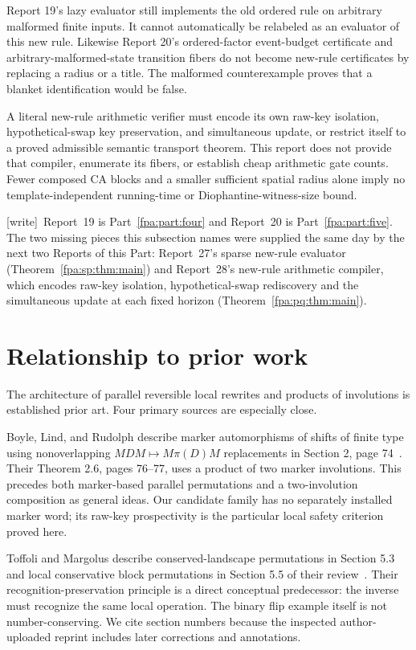 \documentclass[11pt,a4paper]{article}
\numberwithin{equation}{section}
\newcommand{\wtag}{\textup{[write]}}
\begin{document}
Report 19's lazy evaluator still implements the old ordered rule on arbitrary malformed finite inputs. It cannot automatically be relabeled as an evaluator of this new rule. Likewise Report 20's ordered-factor event-budget certificate and arbitrary-malformed-state transition fibers do not become new-rule certificates by replacing a radius or a title. The malformed counterexample proves that a blanket identification would be false.

A literal new-rule arithmetic verifier must encode its own raw-key isolation, hypothetical-swap key preservation, and simultaneous update, or restrict itself to a proved admissible semantic transport theorem. This report does not provide that compiler, enumerate its fibers, or establish cheap arithmetic gate counts. Fewer composed CA blocks and a smaller sufficient spatial radius alone imply no template-independent running-time or Diophantine-witness-size bound.

\wtag\ Report~19 is Part~\ref{fpa:part:four} and Report~20 is Part~\ref{fpa:part:five}. The two missing pieces this subsection names were supplied the same day by the next two Reports of this Part: Report~27's sparse new-rule evaluator (Theorem~\ref{fpa:sp:thm:main}) and Report~28's new-rule arithmetic compiler, which encodes raw-key isolation, hypothetical-swap rediscovery and the simultaneous update at each fixed horizon (Theorem~\ref{fpa:pq:thm:main}).

\section{Relationship to prior work}\label{fpa:pi:sec:prior}
The architecture of parallel reversible local rewrites and products of involutions is established prior art. Four primary sources are especially close.

Boyle, Lind, and Rudolph describe marker automorphisms of shifts of finite type using nonoverlapping $MDM\mapsto M\pi(D)M$ replacements in Section 2, page 74~\cite{fpa:blr}. Their Theorem 2.6, pages 76--77, uses a product of two marker involutions. This precedes both marker-based parallel permutations and a two-involution composition as general ideas. Our candidate family has no separately installed marker word; its raw-key prospectivity is the particular local safety criterion proved here.

Toffoli and Margolus describe conserved-landscape permutations in Section 5.3 and local conservative block permutations in Section 5.5 of their review~\cite{fpa:tm}. Their recognition-preservation principle is a direct conceptual predecessor: the inverse must recognize the same local operation. The binary flip example itself is not number-conserving. We cite section numbers because the inspected author-uploaded reprint includes later corrections and annotations.
\end{document}
